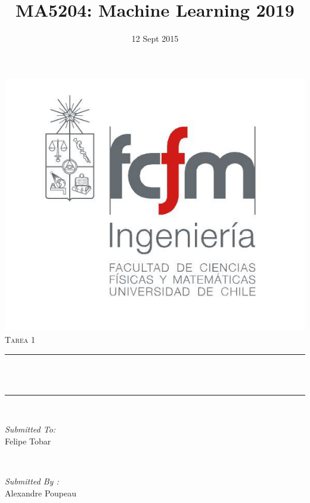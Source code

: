 \documentclass{article}
\title{MA5204: Machine Learning 2019}								%
\date{12 Sept 2015}											%
\makeatletter
\let\thetitle\@title
\makeatother
\begin{document}

\begin{titlepage}
	\centering
    \vspace*{0.5 cm}
    \includegraphics[scale = 0.4]{logoFCFM.jpg}\\[1.0 cm]	%
	\textsc{\LARGE Tarea 1}\\[0.5 cm]				%
	\rule{\linewidth}{0.2 mm} \\[0.4 cm]
	{ \huge \bfseries \thetitle}\\
	\rule{\linewidth}{0.2 mm} \\[1.5 cm]

	\begin{minipage}{0.4\textwidth}
		\begin{flushleft} \large
			\emph{Submitted To:}\\
			Felipe Tobar\\
			\end{flushleft}
			\end{minipage}~
			\begin{minipage}{0.4\textwidth}

			\begin{flushright} \large
			\emph{Submitted By :} \\
		  Alexandre Poupeau\\
		\end{flushright}

	\end{minipage}\\[2 cm]







\end{titlepage}
\end{document}
